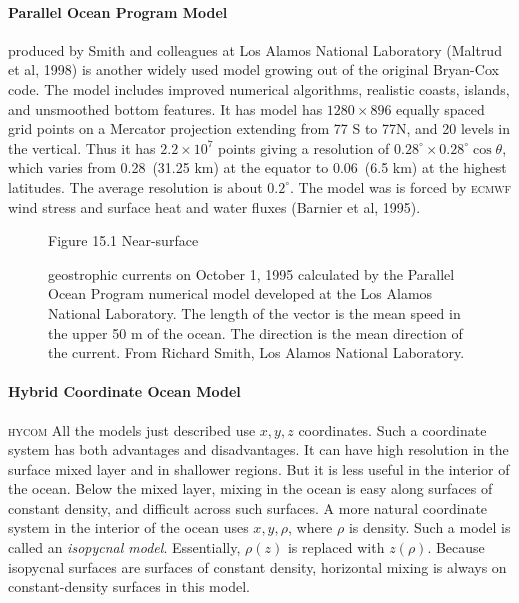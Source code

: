 \paragraph{Parallel Ocean Program Model}
produced by Smith and colleagues at Los
Alamos National Laboratory (Maltrud et al, 1998) is another widely
used model growing out of the original Bryan-Cox code. The model
includes improved numerical algorithms, realistic coasts, islands, and
unsmoothed bottom features. It has model has $1280 \times 896$ equally
spaced grid points on a Mercator projection extending from 77\degrees
S to 77\degrees N, and 20 levels in the vertical. Thus it has $2.2
\times 10^{7}$ points giving a resolution of $0.28^{\circ} \times
0.28^{\circ} \cos \theta $, which varies from 0.28\degrees\ (31.25 km)
at the equator to 0.06\degrees\ (6.5 km) at the highest latitudes. The
average resolution is about $0.2^{\circ}$. The model was is forced by
\textsc{ecmwf} wind stress and
surface heat and water fluxes (Barnier et al, 1995).

\begin{figure}[t!]
   \footnotesize
  Figure 15.1 Near-surface \rule{0mm}{1ex}geostrophic
  currents
  on October 1, 1995 calculated by the Parallel Ocean Program
  numerical model developed at the Los Alamos National Laboratory. The
  length of the vector is the mean speed in the upper 50 m of the
  ocean. The direction is the mean direction of the current. From
  Richard Smith, Los Alamos National Laboratory.
\vspace{-4ex}
\label{fig:model_out}
\end{figure}

\paragraph{Hybrid Coordinate Ocean Model}
\textsc{hycom} All the models just
described use $x, y, z$ coordinates. Such a coordinate system has both
advantages and disadvantages. It can have high resolution in the
surface mixed layer and in shallower regions. But it is less useful in
the interior of the ocean. Below the mixed layer,
mixing in the ocean is
easy along surfaces of constant density, and difficult across such
surfaces. A more natural coordinate system in the interior of the
ocean uses $x, y, \rho$, where $\rho$ is density. Such a model is
called an \textit{isopycnal model}. Essentially, $\rho (z)$ is replaced with
$z (\rho )$. Because isopycnal surfaces are surfaces of constant
density, horizontal mixing is always
on constant-density surfaces in this model.

